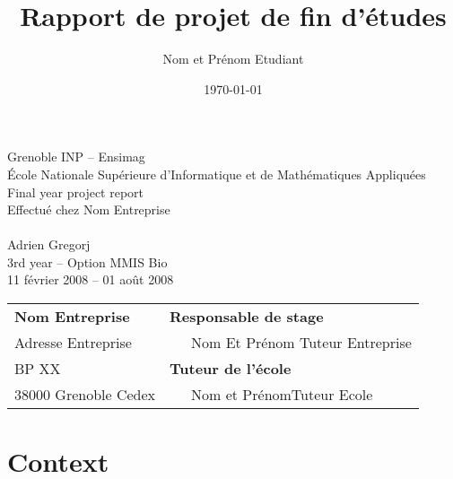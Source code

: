 \documentclass[12pt,a4paper,twoside]{article}
\title{Rapport de projet de fin d'études}
\author{Nom et Prénom Etudiant}
\date{\today}
\begin{document}
\lstset{ numbers=left, tabsize=3, frame=single, numberstyle=\ttfamily, basicstyle=\footnotesize} 
\thispagestyle{empty}

\begin{center}
Grenoble INP  -- Ensimag\\
École Nationale Supérieure d'Informatique et de Mathématiques Appliquées\\
\vspace{3cm}
{\LARGE Final year project report}\\
\vspace{1cm}
Effectué chez Nom Entreprise\\
\vspace{2cm}
\\
\vspace{3cm}
Adrien Gregorj\\
3rd year -- Option MMIS Bio\\
\vspace{3mm}
11 février 2008 -- 01 août 2008\\
\vspace{4cm}
\begin{tabular}{p{10cm}p{10cm}}
{\bf Nom Entreprise}                                            &{\bf Responsable de stage}\\
{\footnotesize Adresse Entreprise}       & ~~~Nom Et Prénom Tuteur Entreprise\\
{\footnotesize BP XX}                                        & {\bf Tuteur de l'école}\\
{\footnotesize 38000 Grenoble Cedex}                          & ~~~Nom et PrénomTuteur Ecole\\
\end{tabular}
\end{center}
\newpage



\section{Context}
\end{document}
